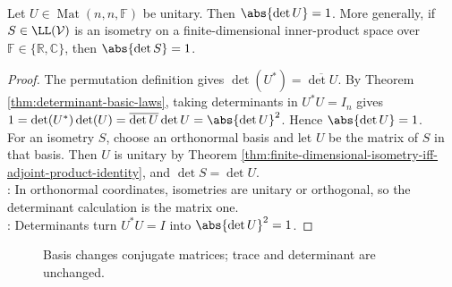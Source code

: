 \begin{proposition} \label{prop:isometry-determinant-absolute-one} \\
Let $U\in\operatorname{Mat}(n,n,\mathbb{F})$ be unitary. Then $\abs{\det U}=1$. More generally, if $S\in\LL(\mathcal{V})$ is an isometry on a finite-dimensional inner-product space over $\mathbb{F}\in\{\mathbb{R},\mathbb{C}\}$, then $\abs{\det S}=1$.
\begin{proof}
The permutation definition gives $\det(U^*)=\overline{\det U}$. By Theorem \ref{thm:determinant-basic-laws}, taking determinants in $U^*U=I_n$ gives $1=\det(U^*)\det(U)=\overline{\det U}\det U=\abs{\det U}^2$. Hence $\abs{\det U}=1$.\\
For an isometry $S$, choose an orthonormal basis and let $U$ be the matrix of $S$ in that basis. Then $U$ is unitary by Theorem \ref{thm:finite-dimensional-isometry-iff-adjoint-product-identity}, and $\det S=\det U$.\\
: In orthonormal coordinates, isometries are unitary or orthogonal, so the determinant calculation is the matrix one.\\
: Determinants turn $U^*U=I$ into $\abs{\det U}^2=1$.
\end{proof}
\end{proposition}

\begin{figure}[H]
  \centering
  
  \caption{Basis changes conjugate matrices; trace and determinant are unchanged.}
  \label{fig:operator-trace-determinant-basis-invariance}
\end{figure}


